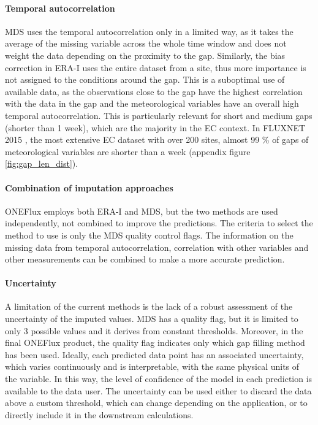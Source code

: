 \documentclass{article}
\begin{document}
\paragraph{Temporal autocorrelation} MDS uses the temporal autocorrelation only in a limited way, as it takes the average of the missing variable across the whole time window and does not weight the data depending on the proximity to the gap.  Similarly, the bias correction in ERA-I uses the entire dataset from a site, thus more importance is not assigned to the conditions around the gap.  This is a suboptimal use of available data, as the observations close to the gap have the highest correlation with the data in the gap and the meteorological variables have an overall high temporal autocorrelation. This is particularly relevant for short and medium gaps (shorter than 1 week), which are the majority in the EC context.
In FLUXNET 2015 \cite{pastorello_fluxnet2015_2020}, the most extensive EC dataset with over 200 sites, almost 99 \% of gaps of meteorological variables are shorter than a week (appendix figure \ref{fig:gap_len_dist}).

\paragraph{Combination of imputation approaches} ONEFlux employs both ERA-I and MDS, but the two methods are used independently, not combined to improve the predictions. The criteria to select the method to use is only the MDS quality control flags. The information on the missing data from temporal autocorrelation, correlation with other variables and other measurements can be combined to make a more accurate prediction.

\paragraph{Uncertainty} A limitation of the current methods is the lack of a robust assessment of the uncertainty of the imputed values. MDS has a quality flag, but it is limited to only 3 possible values and it derives from constant thresholds. Moreover, in the final ONEFlux product, the quality flag indicates only which gap filling method has been used. Ideally, each predicted data point has an associated uncertainty, which varies continuously and is interpretable, with the same physical units of the variable.  In this way, the level of confidence of the model in each prediction is available to the data user. The uncertainty can be used either to discard the data above a custom threshold, which can change depending on the application, or to directly include it in the downstream calculations.
\end{document}
